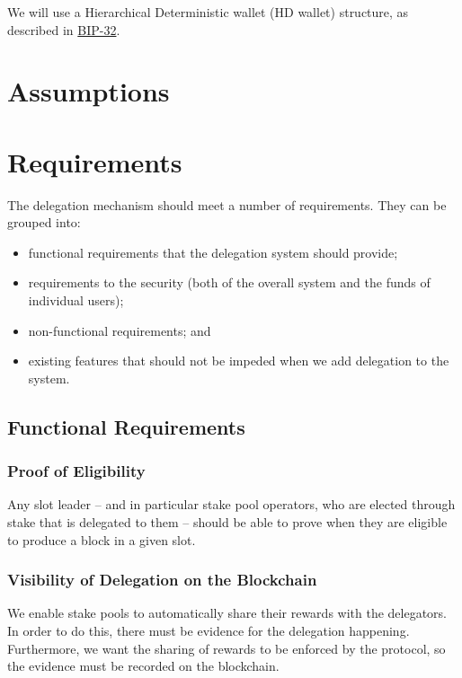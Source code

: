 \documentclass[11pt,a4paper]{article}
\begin{document}
We will use a Hierarchical Deterministic wallet (HD wallet) structure,
as described in
\href{https://github.com/bitcoin/bips/blob/master/bip-0032.mediawiki.}{BIP-32}.

\section{Assumptions}\label{assumptions}

\section{Requirements}\label{requirements}

The delegation mechanism should meet a number of requirements. They can
be grouped into:

\begin{itemize}
\item
  functional requirements that the delegation system should provide;
\item
  requirements to the security (both of the overall system and the funds
  of individual users);
\item
  non-functional requirements; and
\item
  existing features that should not be impeded when we add delegation to
  the system.
\end{itemize}

\subsection{Functional Requirements}\label{functional-requirements}

\subsubsection{Proof of Eligibility}\label{proof-of-eligibility}

Any slot leader -- and in particular stake pool operators, who are
elected through stake that is delegated to them -- should be able to
prove when they are eligible to produce a block in a given slot.

\subsubsection{Visibility of Delegation on the
Blockchain}\label{visibility-of-delegation-on-the-blockchain}

We enable stake pools to automatically share their rewards with the
delegators. In order to do this, there must be evidence for the
delegation happening. Furthermore, we want the sharing of rewards to be
enforced by the protocol, so the evidence must be recorded on the
blockchain.
\end{document}

